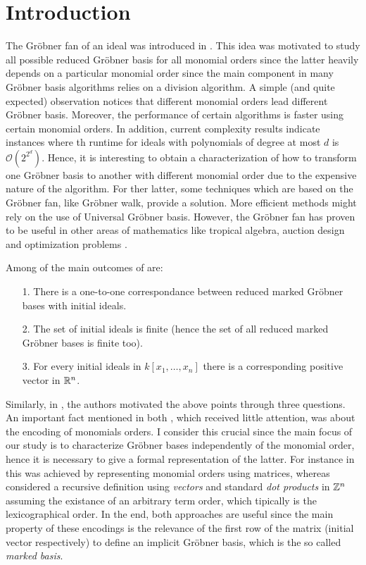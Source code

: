 \section{Introduction}

The Gr\"obner fan of an ideal was introduced in \cite{MORA1988183}.
This idea was motivated to study all possible reduced Gr\"obner
basis for all monomial orders since the latter heavily depends
on a particular monomial order \cite{Cox:2015:IVA:2821082}
since the main component in many Gr\"obner basis algorithms
relies on a division algorithm. A simple (and quite expected)
observation notices that different monomial orders lead
different Gr\"obner basis. Moreover, the performance of certain
algorithms is faster using certain monomial orders. In addition,
current complexity results \cite{MAYR1982305} indicate instances
where th runtime for ideals with polynomials of
degree at most $d$ is $\mathcal{O}(2^{2^d})$. Hence, it is interesting to
obtain a characterization of how to transform one Gr\"obner
basis to another with different monomial order due to the expensive
nature of the algorithm. For ther latter,
some techniques which are based on the Gr\"obner fan, like Gr\"obner walk,
provide a solution. More efficient methods might rely on the use of
Universal Gr\"obner basis. However, the Gr\"obner fan has proven to
be useful in other areas of mathematics like tropical algebra, auction
design and optimization problems \cite{2014arXiv1408.0313K}.

Among of the main outcomes of \cite{MORA1988183} are:

\begin{itemize}
\item[1.] There is a one-to-one correspondance between reduced
  marked Gr\"obner bases with initial ideals.
\item[2.] The set of initial ideals is finite (hence the set of all
  reduced marked Gr\"obner bases is finite too).
\item[3.] For every initial ideals in $k[x_1, \dots, x_n]$
  there is a corresponding positive vector in $\mathbb{R}^n$.  
\end{itemize}

Similarly, in \cite{Cox:2014}, the authors motivated the above points
through three questions. An important fact mentioned
in both \cite{Cox:2014, SturmfelsGrobConv}, which received little attention,
was about the encoding of monomials orders. I consider this crucial since the
main focus of our study is to characterize Gr\"obner bases independently
of the monomial order, hence it is necessary to give a formal representation
of the latter. For instance in \cite{Cox:2014} this was achieved by
representing monomial orders using matrices, whereas \cite{SturmfelsGrobConv}
considered a recursive definition using \emph{vectors} and standard \emph{dot products}
in $\mathbb{Z}^n$ assuming the existance of an arbitrary term order, which tipically
is the lexicographical order. In the end, both approaches are useful
since the main property of these encodings is the relevance of the first
row of the matrix (initial vector respectively) to define an implicit
Gr\"obner basis, which is the so called \emph{marked \grob basis}.

